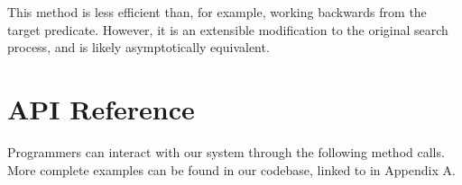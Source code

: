 \documentclass[letterpaper]{article}
\begin{document}
This method is less efficient than, for example, working backwards from the target predicate.  However, it is an extensible modification to the original search process, and is likely asymptotically equivalent.

\section{API Reference}

Programmers can interact with our system through the following method calls.  More complete examples can be found in our codebase, linked to in Appendix A.

\newcommand{\doc}[3]{\item \texttt{#1}: #2\\\\Example: \texttt{#3}}
\end{document}
